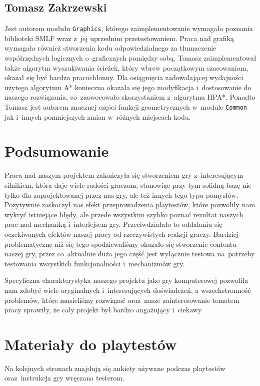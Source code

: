 \documentclass[licencjacka]{pracamgr}
\begin{document}
  \section{Tomasz Zakrzewski}
    Jest autorem modułu \texttt{Graphics}, którego zaimplementowanie wymagało poznania biblioteki SMLF wraz z~jej uprzednim przetestowaniem.
    Praca nad grafiką wymagała również stworzenia kodu odpowiedzialnego za tłumaczenie współrzędnych logicznych o~graficznych pomiędzy sobą.
    Tomasz zaimplementował także algorytm wyszukiwania ścieżek, który wbrew początkowym szacowaniom, okazał się być bardzo pracochłonny.
    Dla osiągnięcia zadowalającej wydajności użytego algorytmu A* konieczna okazała się jego modyfikacja i~dostosowanie do naszego rozwiązania,
    co~zaowocowało skorzystaniem z~algorytmu HPA*. Ponadto Tomasz jest autorem znacznej części funkcji geometrycznych w~module \texttt{Common}
    jak i~innych pomniejszych zmian w~różnych miejscach kodu.

\chapter{Podsumowanie}
  Praca nad naszym projektem zakończyła się stworzeniem gry z~interesującym silnikiem, która daje wiele radości graczom,
  stanowiąc przy tym solidną bazę nie tylko dla zaprojektowanej przez nas gry, ale też innych tego typu pomysłów.
  Pozytywnie zaskoczył nas efekt przeprowadzenia playtestów, które pozwoliły nam wykryć istniejące błędy, 
  ale przede wszystkim szybko poznać rezultat naszych prac nad mechaniką i~interfejsem gry. Przeciwdziałało to oddalaniu
  się oczekiwanych efektów naszej pracy od rzeczywistych reakcji graczy. Bardziej problematyczne niż się tego
  spodziewaliśmy okazało się stworzenie contentu naszej gry, przez co~aktualnie duża jego część jest wyłącznie testowa
  na~potrzeby testowania wszystkich funkcjonalności i~mechanizmów gry. 

  Specyficzna charakterystyka naszego projektu jako gry komputerowej pozwoliła nam zdobyć wiele oryginalnych i~interesujących
  doświadczeń, a wszechstronność problemów, które musieliśmy rozwiązać oraz~nasze zainteresowanie tematem pracy sprawiły,
  że cały projekt był bardzo angażujący i~ciekawy.


\appendix

\chapter{Materiały do playtestów}
  Na kolejnych stronach znajdują się ankiety używane podczas playtestów
  oraz~instrukcja gry wręczana testerom.
\end{document}
